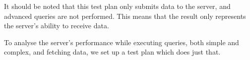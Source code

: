 It should be noted that this test plan only submits data to the server, and advanced queries are not performed.
This means that the result only represents the server's ability to receive data.

\bigskip
To analyse the server's performance while executing queries, both simple and complex, and fetching data, we set up a test plan which does just that.

